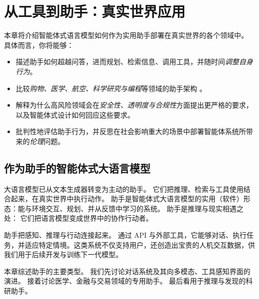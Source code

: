 \chapter[从工具到助手]{从工具到助手：真实世界应用}
\label{sec:assist}

\begin{learningbox}
本章将介绍智能体式语言模型如何作为实用助手部署在真实世界的各个领域中。
具体而言，你将能够：
\begin{itemize}[leftmargin=*, nosep]
    \item 描述助手如何超越问答，进而规划、检索信息、调用工具，并随时间{\em 调整自身行为}。
    \item 比较{\em 购物、医学、航空、科学研究与编程}等领域的助手架构
    。
    \item 解释为什么高风险领域会在{\em 安全性、透明度与合规性}方面提出更严格的要求，以及智能体式设计如何回应这些要求。
    \item 批判性地评估助手行为，并反思在社会影响重大的场景中部署智能体系统所带来的{\em 伦理}问题。
\end{itemize}
\end{learningbox}

\section{作为助手的智能体式大语言模型}
大语言模型已从文本生成器转变为主动的助手。
它们把推理、检索与工具使用结合起来，在真实世界中执行动作。
助手是智能体式大语言模型的实用（软件）形态：能与环境交互、规划、并从反馈中学习的系统。
助手是推理与现实相遇之处：
它们把语言模型变成世界中的协作行动者。

助手把感知、推理与行动连接起来。
通过 API 与外部工具，它能够对话、执行任务，并适应特定情境。这类系统不仅支持用户，还创造出宝贵的人机交互数据，供我们用于后续开发与训练下一代模型。

本章综述助手的主要类型。
我们先讨论对话系统及其向多模态、工具感知界面的演进。
接着讨论医学、金融与交易领域的专用助手。
最后看用于推理与发现的科研助手。



